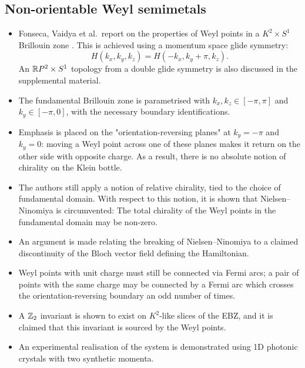 \subsection{Non-orientable Weyl semimetals}

{\color{blue}
\begin{itemize}
	\item Fonseca, Vaidya et al.\ report on the properties of Weyl points in a $K^2\times S^1$ Brillouin zone \cite{Fonseca-Vaidya_nonorientable}. This is achieved using a momentum space glide symmetry:
	\begin{equation}\label{eq:3D_glide}
		H(k_x, k_y, k_z) = H(-k_x, k_y + \pi, k_z).
	\end{equation}
	An $\mathbb{R} P^2\times S^1$ topology from a double glide symmetry is also discussed in the supplemental material.
	
	\item The fundamental Brillouin zone is parametrised with $k_x,k_z\in[-\pi,\pi]$ and $k_y\in[-\pi,0]$, with the necessary boundary identifications.
	
	\item Emphasis is placed on the "orientation-reversing planes" at $k_y = -\pi$ and $k_y = 0$: moving a Weyl point across one of these planes makes it return on the other side with opposite charge. As a result, there is no absolute notion of chirality on the Klein bottle.
	
	\item The authors still apply a notion of relative chirality, tied to the choice of fundamental domain. With respect to this notion, it is shown that Nielsen--Ninomiya is circumvented: The total chirality of the Weyl points in the fundamental domain may be non-zero.
	
	\item An argument is made relating the breaking of Nielsen--Ninomiya to a claimed discontinuity of the Bloch vector field defining the Hamiltonian.
	
	\item Weyl points with unit charge must still be connected via Fermi arcs; a pair of points with the same charge may be connected by a Fermi arc which crosses the orientation-reversing boundary an odd number of times.
	
	\item A $\mathbb{Z}_2$ invariant is shown to exist on $K^2$-like slices of the EBZ, and it is claimed that this invariant is sourced by the Weyl points.
	
	\item An experimental realisation of the system is demonstrated using 1D photonic crystals with two synthetic momenta.
\end{itemize}
}


